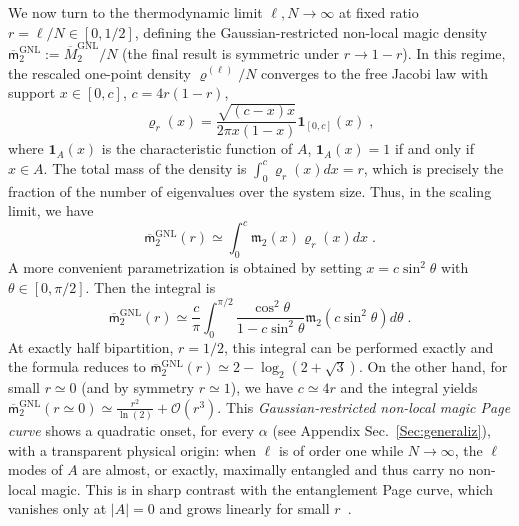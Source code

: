 \documentclass[prx,twocolumn,superscriptaddress,aps,10pt, frontmatterverbose, reprint,footinbib,longbibliography=true]{revtex4-2}
\newcommand{\RENYI}{\alpha}
\begin{document}
We now turn to the thermodynamic limit $\ell,N\to\infty$ at fixed ratio $r=\ell/N\in[0,1/2]$, defining the Gaussian-restricted non-local magic density $\overline{\mathsf{m}}_2^\mathrm{GNL}:=\overline{M}_2^\mathrm{GNL}/N$ (the final result is symmetric under $r\to 1-r$).
In this regime, the rescaled  one-point density $\varrho^{(\ell)}/N$ converges to the free Jacobi law with support $x\in [0,c]$, $c=4r(1-r)$,
\begin{equation}
    \varrho_r(x) = \frac{\sqrt{(c-x)x}}{2\pi x(1-x)}\mathbf{1}_{[0,c]}(x)\;,
\end{equation}
where $\mathbf{1}_A(x)$ is the characteristic function of $A$, $\mathbf{1}_A(x)=1$ if and only if $x\in A$. 
The total mass of the density is $\int_0^c \varrho_r(x) dx=r$, which is precisely the fraction of the number of eigenvalues over the system size. 
Thus, in the scaling limit, we have
\begin{equation}
\overline{\mathsf{m}}_2^\mathrm{GNL}(r)\simeq \int_0^c \mathfrak{m}_2(x) \varrho_r(x)dx\;.
\end{equation}
A more convenient parametrization is obtained by setting $x=c\sin^2\theta$  with $\theta\in[0,\pi/2]$. Then the integral is 
\begin{equation}
\overline{\mathsf{m}}_2^\mathrm{GNL}(r)\simeq \frac{c}{\pi}\int_0^{\pi/2} \frac{\cos^2 \theta}{1-c\sin^2\theta} \mathfrak{m}_2(c\sin^2 \theta)d\theta\;.\label{eq:ziopin2}
\end{equation}
At exactly half bipartition, $r=1/2$, this integral can be performed exactly and the formula reduces to 
$\overline{\mathsf{m}}_2^\mathrm{GNL}(r)\simeq 2-\log_2(2+\sqrt{3})$.
On the other hand, for small $r\simeq 0$ (and by symmetry $r\simeq 1$), we have $c\simeq 4r$ and the integral yields $\overline{\mathsf{m}}_2^\mathrm{GNL}(r\simeq 0)\simeq \frac{r^2}{\ln(2)}+\mathcal{O}(r^3)$. 
This {\em Gaussian-restricted non-local magic Page curve} shows a  quadratic onset,  for every $\RENYI$ (see Appendix Sec.~\ref{Sec:generaliz}), with a transparent physical origin: when $\ell$ is of order one while $N\to\infty$, the $\ell$ modes of $A$ are almost, or exactly, maximally entangled and thus carry no non-local magic. 
This is in sharp contrast with the entanglement Page curve, which vanishes only at $|A|=0$ and grows linearly for small $r$~\cite{PhysRevE.106.034118,PhysRevLett.125.180604,PhysRevB.103.L241118}.
\end{document}
